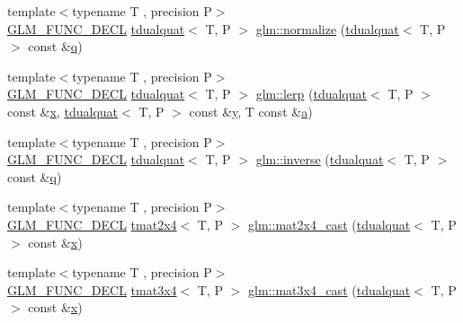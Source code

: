 \begin{DoxyCompactItemize}
\item 
{\footnotesize template$<$typename T , precision P$>$ }\\\mbox{\hyperlink{setup_8hpp_ab2d052de21a70539923e9bcbf6e83a51}{G\+L\+M\+\_\+\+F\+U\+N\+C\+\_\+\+D\+E\+CL}} \mbox{\hyperlink{structglm_1_1tdualquat}{tdualquat}}$<$ T, P $>$ \mbox{\hyperlink{group__gtx__dual__quaternion_ga495818aa48c23e9e730f87a3c337d1d5}{glm\+::normalize}} (\mbox{\hyperlink{structglm_1_1tdualquat}{tdualquat}}$<$ T, P $>$ const \&\mbox{\hyperlink{glad_8h_a514729309336df22bcc8eda979d6ced4}{q}})
\item 
{\footnotesize template$<$typename T , precision P$>$ }\\\mbox{\hyperlink{setup_8hpp_ab2d052de21a70539923e9bcbf6e83a51}{G\+L\+M\+\_\+\+F\+U\+N\+C\+\_\+\+D\+E\+CL}} \mbox{\hyperlink{structglm_1_1tdualquat}{tdualquat}}$<$ T, P $>$ \mbox{\hyperlink{group__gtx__dual__quaternion_ga8039b88397ca09275be924a26a806a59}{glm\+::lerp}} (\mbox{\hyperlink{structglm_1_1tdualquat}{tdualquat}}$<$ T, P $>$ const \&\mbox{\hyperlink{glad_8h_a92d0386e5c19fb81ea88c9f99644ab1d}{x}}, \mbox{\hyperlink{structglm_1_1tdualquat}{tdualquat}}$<$ T, P $>$ const \&\mbox{\hyperlink{glad_8h_a66ddd433d2cacfe27f5906b7e86faeed}{y}}, T const \&\mbox{\hyperlink{glad_8h_ac8729153468b5dcf13f971b21d84d4e5}{a}})
\item 
{\footnotesize template$<$typename T , precision P$>$ }\\\mbox{\hyperlink{setup_8hpp_ab2d052de21a70539923e9bcbf6e83a51}{G\+L\+M\+\_\+\+F\+U\+N\+C\+\_\+\+D\+E\+CL}} \mbox{\hyperlink{structglm_1_1tdualquat}{tdualquat}}$<$ T, P $>$ \mbox{\hyperlink{group__gtx__dual__quaternion_ga2149d3cb8af04d9530de0cd16aa1aab2}{glm\+::inverse}} (\mbox{\hyperlink{structglm_1_1tdualquat}{tdualquat}}$<$ T, P $>$ const \&\mbox{\hyperlink{glad_8h_a514729309336df22bcc8eda979d6ced4}{q}})
\item 
{\footnotesize template$<$typename T , precision P$>$ }\\\mbox{\hyperlink{setup_8hpp_ab2d052de21a70539923e9bcbf6e83a51}{G\+L\+M\+\_\+\+F\+U\+N\+C\+\_\+\+D\+E\+CL}} \mbox{\hyperlink{structglm_1_1tmat2x4}{tmat2x4}}$<$ T, P $>$ \mbox{\hyperlink{group__gtx__dual__quaternion_ga2d124748183e12db8288eeaca350298e}{glm\+::mat2x4\+\_\+cast}} (\mbox{\hyperlink{structglm_1_1tdualquat}{tdualquat}}$<$ T, P $>$ const \&\mbox{\hyperlink{glad_8h_a92d0386e5c19fb81ea88c9f99644ab1d}{x}})
\item 
{\footnotesize template$<$typename T , precision P$>$ }\\\mbox{\hyperlink{setup_8hpp_ab2d052de21a70539923e9bcbf6e83a51}{G\+L\+M\+\_\+\+F\+U\+N\+C\+\_\+\+D\+E\+CL}} \mbox{\hyperlink{structglm_1_1tmat3x4}{tmat3x4}}$<$ T, P $>$ \mbox{\hyperlink{group__gtx__dual__quaternion_ga576745d979e3c079a64152490c816954}{glm\+::mat3x4\+\_\+cast}} (\mbox{\hyperlink{structglm_1_1tdualquat}{tdualquat}}$<$ T, P $>$ const \&\mbox{\hyperlink{glad_8h_a92d0386e5c19fb81ea88c9f99644ab1d}{x}})

\end{DoxyCompactItemize}
